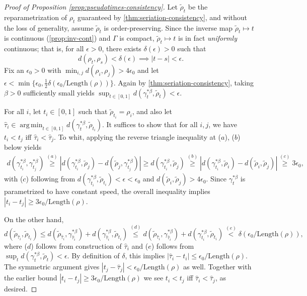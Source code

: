 \documentclass[aos, preprint]{imsart}
\theoremstyle{plain}
\theoremstyle{remark}
\DeclareMathOperator*{\argmin}{arg\,min}
\begin{document}
\begin{appendix}
\begin{proof}[Proof of Proposition
  \ref{prop:pseudotimes-consistency}]
    Let $\tilde{\rho}_t$ be the reparametrization of $\rho_t$
    guaranteed by \cref{thm:seriation-consistency}, and without the
    loss of generality, assume $\tilde{\rho}_t$ is order-preserving.
    Since the inverse map $\tilde \rho_t \mapsto t$ is continuous
    (\cref{prop:inv-cont}) and $\Gamma$ is compact, $\tilde \rho_t
    \mapsto t$ is in fact \emph{uniformly} continuous; that is, for
    all $\epsilon > 0$, there exists $\delta(\epsilon) > 0$ such
    that
    \[
      \tag{$\forall s,t \in [0,1]$} d(\rho_t, \rho_s) <
      \delta(\epsilon) \implies |t-s| < \epsilon.
    \]
    Fix an $\epsilon_0 > 0$ with $\min_{i,j} d(\rho_i, \rho_j) >
    4\epsilon_0$ and let $\epsilon < \min \{\epsilon_0, \frac{1}{2}
    \delta(\epsilon_0/\mathrm{Length}(\rho))\}$. Again by
    \cref{thm:seriation-consistency}, taking $\beta > 0$ sufficiently
    small yields $\sup_{t\in[0,1]} d(\gamma_t^{*\beta},
    \tilde{\rho}_t) < \epsilon$.

    For all $i$, let $t_i \in [0,1]$ such that $\tilde{\rho}_{t_i} =
    \rho_i$, and also let $\hat{\tau}_i \in \argmin_{t \in [0,1]}
    d(\gamma_t^{*\beta}, \tilde{\rho}_{t_i})$. It suffices to show
    that for all $i,j$, we have $t_i < t_j$ iff $\hat{\tau}_i <
    \hat{\tau}_j$. To whit, applying the reverse triangle inequality at
    ($a$), ($b$) below yields
    \begin{align*}
      d(\gamma_{t_i}^{*\beta}, \gamma_{t_j}^{*\beta}) \overset{(a)}{\geq}
      |d(\gamma_{t_i}^{*\beta}, \tilde{\rho}_j) - d(\tilde{\rho}_j,
      \gamma_{t_j}^{*\beta})|
      \geq d(\gamma_{t_i}^{*\beta}, \tilde{\rho}_j)
      \overset{(b)}{\geq} |d(\gamma_{t_i}^{*\beta}, \tilde{\rho}_i) -
        d(\tilde{\rho}_i, \tilde{\rho}_j)| \overset{(c)}{\geq}
      3\epsilon_0,
    \end{align*}
    with ($c$) following from
    $d(\gamma_{t_i}^{*\beta}, \tilde{\rho}_{t_i}) < \epsilon <
    \epsilon_0$ and $d(\tilde{\rho}_i, \tilde{\rho}_j) >
    4\epsilon_0$. Since $\gamma_t^{*\beta}$ is parametrized to have constant speed,
    the overall inequality implies $|t_i - t_j| \geq
    3\epsilon_0/\mathrm{Length}(\rho)$.

    On the other hand,
    \[
      d(\tilde{\rho}_{\hat{\tau}_i}, \tilde{\rho}_{t_i}) \leq
      d(\tilde{\rho}_{\hat{\tau}_i}, \gamma_{\hat{\tau}_i}^{*\beta}) +
      d(\gamma_{\hat{\tau}_i}^{*\beta}, \tilde{\rho}_{t_i})
      \overset{(d)}{\leq}
      d(\tilde{\rho}_{\hat{\tau}_i}, \gamma_{\hat{\tau}_i}^{*\beta}) +
      d(\gamma_{t_i}^{*\beta}, \tilde{\rho}_{t_i}) \overset{(e)}{<}
      \delta(\epsilon_0/\mathrm{Length}(\rho)),
    \]
    where ($d$) follows from construction of $\hat{\tau}_i$ and ($e$)
    follows from $\sup_t d(\gamma_t^{*\beta}, \tilde{\rho}_t) <
    \epsilon$. By definition of $\delta$, this implies $|\hat{\tau}_i -
    t_i| \leq \epsilon_0/\mathrm{Length}(\rho)$. The symmetric
    argument gives $|t_j - \hat{\tau}_j| <
    \epsilon_0/\mathrm{Length}(\rho)$ as well. Together with the
    earlier bound $|t_i - t_j| \geq 3\epsilon_0/\mathrm{Length}(\rho)$
    we see $t_i < t_j$ iff $\hat{\tau}_i < \hat{\tau}_j$, as desired.
\end{proof}


\end{appendix}
\end{document}
